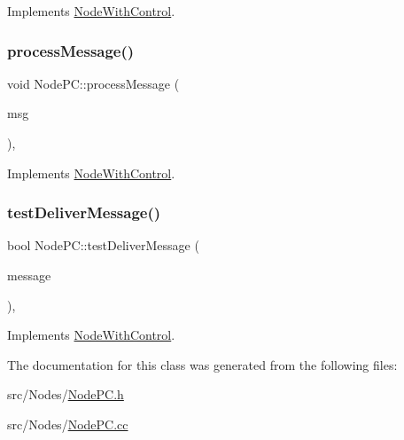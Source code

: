 Implements \hyperlink{class_node_with_control_a4f78078272b90937e0746c797443b37d}{Node\+With\+Control}.

\mbox{\label{class_node_p_c_aa5fedc4136104a06e2f1131f1ba16b0e}} 
\subsubsection{\texorpdfstring{process\+Message()}{processMessage()}}
{\footnotesize\ttfamily void Node\+P\+C\+::process\+Message (\begin{DoxyParamCaption}\item[{c\+Message $\ast$}]{msg }\end{DoxyParamCaption})\hspace{0.3cm}{\ttfamily [protected]}, {\ttfamily [virtual]}}



Implements \hyperlink{class_node_with_control_af532082fab76c38d8c50ca90e991f4c3}{Node\+With\+Control}.

\mbox{\label{class_node_p_c_a54731196935596e0c6f094a5a8420134}} 
\subsubsection{\texorpdfstring{test\+Deliver\+Message()}{testDeliverMessage()}}
{\footnotesize\ttfamily bool Node\+P\+C\+::test\+Deliver\+Message (\begin{DoxyParamCaption}\item[{const \hyperlink{structures_8h_a7e7bdc1d2fff8a9436f2f352b2711ed6}{message\+Info} \&}]{message }\end{DoxyParamCaption})\hspace{0.3cm}{\ttfamily [protected]}, {\ttfamily [virtual]}}



Implements \hyperlink{class_node_with_control_a84df0beabbaed80e7da017d592480515}{Node\+With\+Control}.



The documentation for this class was generated from the following files\+:\begin{DoxyCompactItemize}
\item 
src/\+Nodes/\hyperlink{_node_p_c_8h}{Node\+P\+C.\+h}\item 
src/\+Nodes/\hyperlink{_node_p_c_8cc}{Node\+P\+C.\+cc}\end{DoxyCompactItemize}
